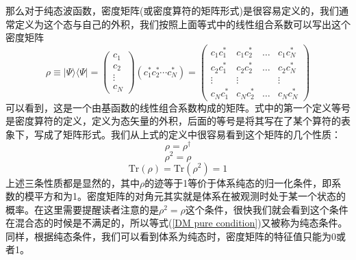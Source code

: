 \documentclass[12pt,a4paper,openany,twoside]{book}
\numberwithin{equation}{section}
\begin{document}
        那么对于纯态波函数，密度矩阵(或密度算符的矩阵形式)是很容易定义的，我们通常定义为这个态与自己的外积，我们按照上面等式中的线性组合系数可以写出这个密度矩阵
        \begin{equation}
          \rho \equiv | \Psi \rangle \langle \Psi |=\left(\begin{array}{c}
            {c_{1}} \\
            {c_{2}} \\
            {\vdots} \\
            {c_{N}}
          \end{array}\right)\left(c_{1}^{*} c_{2}^{*} \cdots c_{{N}}^{*}\right) =\left( \begin{array}{llll}
            {c_1 c_1^*} & {c_1 c_2^*} & {\dots} & {c_1c_N^*} \\
            {c_2 c_1^*} & {c_2c_2^*} & {\dots} & {c_2c_N^*} \\
            {\vdots} & {\vdots} & {} & {\vdots} \\
            {c_Nc_1^*} & {c_Nc_2^*} & {\dots} & {c_Nc_N^*}
          \end{array}\right)
          \label{DM for pure state}
        \end{equation}
        可以看到，这是一个由基函数的线性组合系数构成的矩阵。式中的第一个定义等号是密度算符的定义，定义为态矢量的外积，后面的等号是将其写在了某个算符的表象下，写成了矩阵形式。我们从上式的定义中很容易看到这个矩阵的几个性质：
        \begin{equation}
          \rho = \rho ^{\dagger}
          \label{DM Hermite}
        \end{equation}
        \begin{equation}
          \rho^2 = \rho 
          \label{DM pure condition}
        \end{equation}
        \begin{equation}
          \text{Tr}(\rho) = \text{Tr}(\rho^2) =1 
          \label{DM properties for pure states}
        \end{equation}
        上述三条性质都是显然的，其中$\rho$的迹等于1等价于体系纯态的归一化条件，即系数的模平方和为1。密度矩阵的对角元其实就是体系在被观测时处于某一个状态的概率。在这里需要提醒读者注意的是$\rho^2 = \rho$这个条件，很快我们就会看到这个条件在混合态的时候是不满足的，所以等式(\ref{DM pure condition})又被称为纯态条件。同样，根据纯态条件，我们可以看到体系为纯态时，密度矩阵的特征值只能为0或者1。
\end{document}

